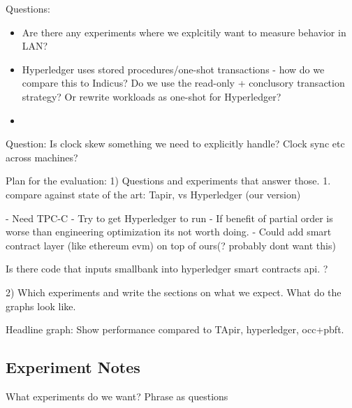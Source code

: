 Questions:
\begin{itemize}
  \item Are there any experiments where we explcitily want to measure behavior in LAN?
  \item Hyperledger uses stored procedures/one-shot transactions - how do we compare this to Indicus? Do we use the read-only + conclusory transaction strategy? Or rewrite workloads as one-shot for Hyperledger?
  \item 
\end{itemize}

Question: Is clock skew something we need to explicitly handle? Clock sync etc across machines?

Plan for the evaluation:
1) Questions and experiments that answer those.
  1. compare against state of the art: Tapir, vs Hyperledger (our version)
  

- Need TPC-C
- Try to get Hyperledger to run
- If benefit of partial order is worse than engineering optimization its not worth doing. 
- Could add smart contract layer (like ethereum evm) on top of ours(? probably dont want this)

Is there code that inputs smallbank into hyperledger smart contracts api. ?


2) Which experiments and write the sections on what we expect. What do the graphs look like.


Headline graph: Show performance compared to TApir, hyperledger, occ+pbft.

\subsection{Experiment Notes}
What experiments do we want? Phrase as questions

